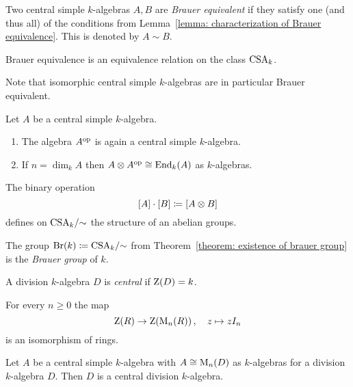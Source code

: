 \begin{definition}
  Two central simple $k$-algebras $A, B$ are \emph{Brauer equivalent} if they satisfy one (and thus all) of the conditions from Lemma~\ref{lemma: characterization of Brauer equivalence}.
  This is denoted by $A \sim B$.
\end{definition}


\begin{corollary}
  Brauer equivalence is an equivalence relation on the class $\operatorname{CSA}_k$.
\end{corollary}


\begin{remark}
  Note that isomorphic central simple $k$-algebras are in particular Brauer equivalent.
\end{remark}


\begin{lemma}
  Let $A$ be a central simple $k$-algebra.
  \begin{enumerate}
    \item
      The algebra $A^{\mathrm{op}}$ is again a central simple $k$-algebra.
    \item
      If $n = \dim_k A$ then $A \otimes A^{\mathrm{op}} \cong \operatorname{End}_k(A)$ as $k$-algebras.
  \end{enumerate}
\end{lemma}


\begin{theorem}
  \label{theorem: existence of brauer group}
  The binary operation
  \[
              [A] \cdot [B]
    \coloneqq  [A \otimes B]
  \]
  defines on $\operatorname{CSA}_k\!/{\sim}$ the structure of an abelian groups.
\end{theorem}


\begin{definition}
  The group $\operatorname{Br}(k) \coloneqq \operatorname{CSA}_k\!/{\sim}$ from Theorem~\ref{theorem: existence of brauer group} is the \emph{Brauer group} of $k$.
\end{definition}


\begin{definition}
  A division $k$-algebra $D$ is \emph{central} if $\operatorname{Z}(D) = k$.
\end{definition}


\begin{lemma}
  For every $n \geq 0$ the map
  \[
            \operatorname{Z}(R)
    \to     \operatorname{Z}(\operatorname{M}_n(R))  \,,
    \quad   z
    \mapsto z I_n
  \]
  is an isomorphism of rings.
\end{lemma}


\begin{corollary}
  Let $A$ be a central simple $k$-algebra with $A \cong \operatorname{M}_n(D)$ as $k$-algebras for a division $k$-algebra $D$.
  Then $D$ is a central division $k$-algebra.
\end{corollary}


